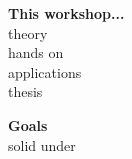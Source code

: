 \documentclass[10pt, compress]{beamer}
\begin{document}
\setcounter{framenumber}{0}

\begin{frame}
  \vspace{.6cm}
  \textbf{This workshop...} \\
  theory \\
  hands on \\
  applications \\
  thesis \\
\end{frame}

\begin{frame}
  \vspace{.6cm}
  \textbf{Goals} \\
  solid under
\end{frame}

\begin{frame}
  \begin{center}
  \end{center}
\end{frame}

\begin{frame}
  \begin{center}
  \end{center}
\end{frame}
\end{document}
